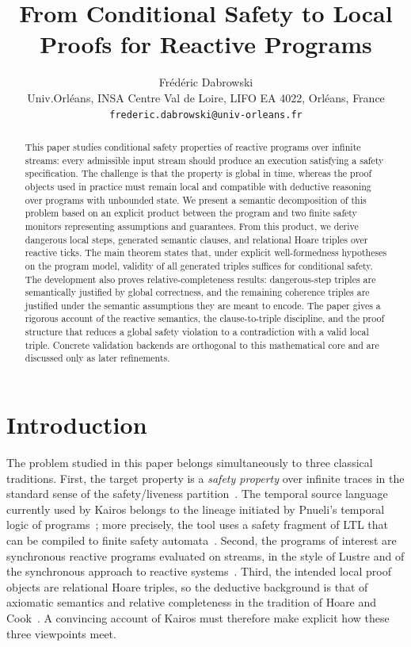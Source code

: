 \documentclass[11pt,a4paper]{article}
\title{From Conditional Safety to Local Proofs for Reactive Programs}
\author{Fr\'ed\'eric Dabrowski\\
Univ.Orl\'eans, INSA Centre Val de Loire, LIFO EA 4022, Orl\'eans, France\\
\texttt{frederic.dabrowski@univ-orleans.fr}}
\date{}
\begin{document}
\maketitle

\begin{abstract}
This paper studies conditional safety properties of reactive programs over infinite
streams: every admissible input stream should produce an execution satisfying a
safety specification. The challenge is that the property is global in time,
whereas the proof objects used in practice must remain local and compatible
with deductive reasoning over programs with unbounded state. We present a
semantic decomposition of this problem based on an explicit product between the
program and two finite safety monitors representing assumptions and guarantees.
From this product, we derive dangerous local steps, generated semantic clauses,
and relational Hoare triples over reactive ticks. The main theorem states that,
under explicit well-formedness hypotheses on the program model, validity of all
generated triples suffices for conditional safety. The development also proves
relative-completeness results: dangerous-step triples are semantically justified
by global correctness, and the remaining coherence triples are justified under
the semantic assumptions they are meant to encode. The paper gives a rigorous
account of the reactive semantics, the clause-to-triple discipline, and the
proof structure that reduces a global safety violation to a contradiction with
a valid local triple. Concrete validation backends are orthogonal to this
mathematical core and are discussed only as later refinements.
\end{abstract}

\section{Introduction}
The problem studied in this paper belongs simultaneously to three classical
traditions. First, the target property is a \emph{safety property} over
infinite traces in the standard sense of the safety/liveness
partition~\cite{alpern-schneider}. The temporal source language currently used
by Kairos belongs to the lineage initiated by Pnueli's temporal logic of
programs~\cite{pnueli-1977}; more precisely, the tool uses a safety fragment of
LTL that can be compiled to finite safety automata~\cite{kupferman-vardi-safety,gastin-oddoux}.
Second, the programs of interest are synchronous reactive programs evaluated on
streams, in the style of Lustre and of the synchronous approach to reactive
systems~\cite{halbwachs-1991,benveniste-sync,lustre-pvs}. Third, the intended
local proof objects are relational Hoare triples, so the deductive background
is that of axiomatic semantics and relative completeness in the tradition of
Hoare and Cook~\cite{hoare-1969,cook-1978,why3}. A convincing account of
Kairos must therefore make explicit how these three viewpoints meet.
\end{document}
